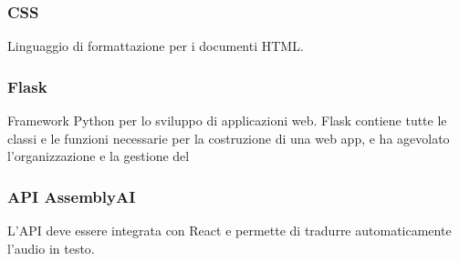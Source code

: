 \subsubsection{CSS}
Linguaggio di formattazione per i documenti HTML.
\subsubsection{Flask}
Framework Python per lo sviluppo di applicazioni web. Flask contiene tutte le classi e le funzioni necessarie per la costruzione di una web app, e ha agevolato l'organizzazione e la gestione del 
\subsubsection{API AssemblyAI}
L'API deve essere integrata con React e permette di tradurre automaticamente l'audio in testo.

\newpage
